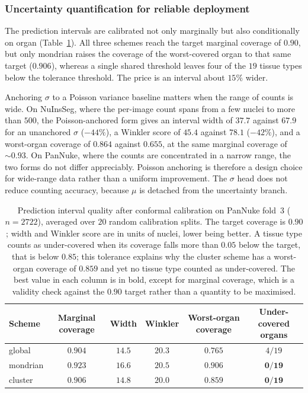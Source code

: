 \documentclass[pdflatex,sn-mathphys-num]{sn-jnl}
\begin{document}
\subsubsection{Uncertainty quantification for reliable deployment}\label{sec:uq}
The prediction intervals are calibrated not only marginally but also conditionally on organ
(Table~\ref{tab:uq}). All three schemes reach the target marginal coverage of $0.90$, but only mondrian raises
the coverage of the worst-covered organ to that same target ($0.906$), whereas a single shared threshold leaves
four of the $19$ tissue types below the tolerance threshold. The price is an interval about $15\%$ wider.

Anchoring $\sigma$ to a Poisson variance baseline matters when the range of counts is wide. On NuInsSeg, where
the per-image count spans from a few nuclei to more than $500$, the Poisson-anchored form gives an interval
width of $37.7$ against $67.9$ for an unanchored $\sigma$ ($-44\%$), a Winkler score of $45.4$ against $78.1$
($-42\%$), and a worst-organ coverage of $0.864$ against $0.655$, at the same marginal coverage of
${\sim}0.93$. On PanNuke, where the counts are concentrated in a narrow range, the two forms do not differ
appreciably. Poisson anchoring is therefore a design choice for wide-range data rather than a uniform
improvement. The $\sigma$ head does not reduce counting accuracy, because $\mu$ is detached from the
uncertainty branch.

\begin{table}[!htbp]
\centering
\caption{Prediction interval quality after conformal calibration on PanNuke fold~3 ($n=2722$), averaged over
$20$ random calibration splits. The target coverage is $0.90$; width and Winkler score are in units of nuclei,
lower being better. A tissue type counts as under-covered when its coverage falls more than $0.05$ below the
target, that is below $0.85$; this tolerance explains why the cluster scheme has a worst-organ coverage of
$0.859$ and yet no tissue type counted as under-covered. The best value in each column is in bold, except for
marginal coverage, which is a validity check against the $0.90$ target rather than a quantity to be
maximised.}\label{tab:uq}
\begin{tabular}{@{}lccccc@{}}
\toprule
Scheme & Marginal coverage & Width & Winkler & Worst-organ coverage & Under-covered organs \\
\midrule
global & $0.904$ & $\mathbf{14.5}$ & $20.3$ & $0.765$ & $4/19$ \\
mondrian & $0.923$ & $16.6$ & $20.5$ & $\mathbf{0.906}$ & $\mathbf{0/19}$ \\
cluster & $0.906$ & $14.8$ & $\mathbf{20.0}$ & $0.859$ & $\mathbf{0/19}$ \\
\bottomrule
\end{tabular}
\end{table}
\end{document}
